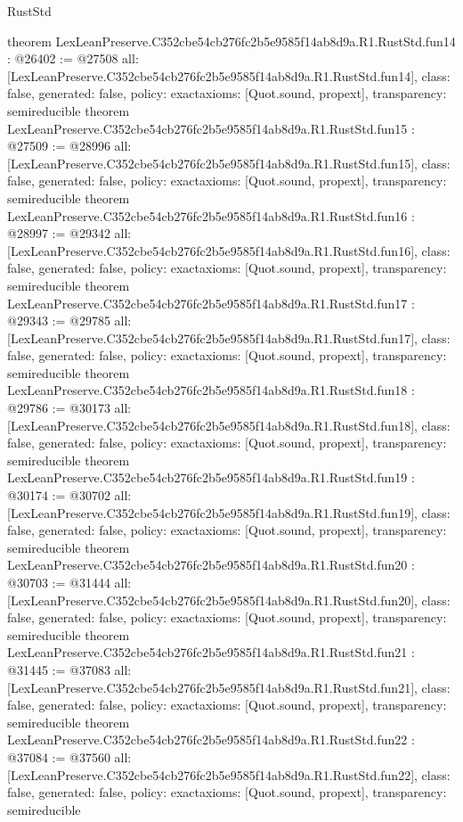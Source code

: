 \begin{lexlean}{RustStd}
\begin{coremodule}
{}
theorem LexLeanPreserve.C352cbe54cb276fc2b5e9585f14ab8d9a.R1.RustStd.fun14 : @26402 := @27508 {
  all: [LexLeanPreserve.C352cbe54cb276fc2b5e9585f14ab8d9a.R1.RustStd.fun14],
  class: false,
  generated: false,
  policy: exact{axioms: [Quot.sound, propext]},
  transparency: semireducible
}
theorem LexLeanPreserve.C352cbe54cb276fc2b5e9585f14ab8d9a.R1.RustStd.fun15 : @27509 := @28996 {
  all: [LexLeanPreserve.C352cbe54cb276fc2b5e9585f14ab8d9a.R1.RustStd.fun15],
  class: false,
  generated: false,
  policy: exact{axioms: [Quot.sound, propext]},
  transparency: semireducible
}
theorem LexLeanPreserve.C352cbe54cb276fc2b5e9585f14ab8d9a.R1.RustStd.fun16 : @28997 := @29342 {
  all: [LexLeanPreserve.C352cbe54cb276fc2b5e9585f14ab8d9a.R1.RustStd.fun16],
  class: false,
  generated: false,
  policy: exact{axioms: [Quot.sound, propext]},
  transparency: semireducible
}
theorem LexLeanPreserve.C352cbe54cb276fc2b5e9585f14ab8d9a.R1.RustStd.fun17 : @29343 := @29785 {
  all: [LexLeanPreserve.C352cbe54cb276fc2b5e9585f14ab8d9a.R1.RustStd.fun17],
  class: false,
  generated: false,
  policy: exact{axioms: [Quot.sound, propext]},
  transparency: semireducible
}
theorem LexLeanPreserve.C352cbe54cb276fc2b5e9585f14ab8d9a.R1.RustStd.fun18 : @29786 := @30173 {
  all: [LexLeanPreserve.C352cbe54cb276fc2b5e9585f14ab8d9a.R1.RustStd.fun18],
  class: false,
  generated: false,
  policy: exact{axioms: [Quot.sound, propext]},
  transparency: semireducible
}
theorem LexLeanPreserve.C352cbe54cb276fc2b5e9585f14ab8d9a.R1.RustStd.fun19 : @30174 := @30702 {
  all: [LexLeanPreserve.C352cbe54cb276fc2b5e9585f14ab8d9a.R1.RustStd.fun19],
  class: false,
  generated: false,
  policy: exact{axioms: [Quot.sound, propext]},
  transparency: semireducible
}
theorem LexLeanPreserve.C352cbe54cb276fc2b5e9585f14ab8d9a.R1.RustStd.fun20 : @30703 := @31444 {
  all: [LexLeanPreserve.C352cbe54cb276fc2b5e9585f14ab8d9a.R1.RustStd.fun20],
  class: false,
  generated: false,
  policy: exact{axioms: [Quot.sound, propext]},
  transparency: semireducible
}
theorem LexLeanPreserve.C352cbe54cb276fc2b5e9585f14ab8d9a.R1.RustStd.fun21 : @31445 := @37083 {
  all: [LexLeanPreserve.C352cbe54cb276fc2b5e9585f14ab8d9a.R1.RustStd.fun21],
  class: false,
  generated: false,
  policy: exact{axioms: [Quot.sound, propext]},
  transparency: semireducible
}
theorem LexLeanPreserve.C352cbe54cb276fc2b5e9585f14ab8d9a.R1.RustStd.fun22 : @37084 := @37560 {
  all: [LexLeanPreserve.C352cbe54cb276fc2b5e9585f14ab8d9a.R1.RustStd.fun22],
  class: false,
  generated: false,
  policy: exact{axioms: [Quot.sound, propext]},
  transparency: semireducible
}
\end{coremodule}
\end{lexlean}
